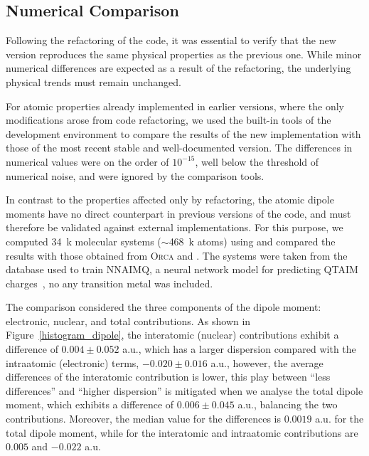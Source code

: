 \subsection{Numerical Comparison}

Following the refactoring of the code, it was essential to verify that the new
version reproduces the same physical properties as the previous one. While
minor numerical differences are expected as a result of the refactoring, the
underlying physical trends must remain unchanged.

For atomic properties already implemented in earlier versions, where the only
modifications arose from code refactoring, we used the built-in tools of the
\ams development environment to compare the results of the new implementation
with those of the most recent stable and well-documented version. The
differences in numerical values were on the order of $10^{-15}$, well below the
threshold of numerical noise, and were ignored by the comparison tools.

\lstset{style=mystyle}

In contrast to the properties affected only by refactoring, the atomic dipole
moments have no direct counterpart in previous versions of the code, and must
therefore be validated against external implementations. For this purpose, we
computed 34~k molecular systems ($\sim$468~k atoms) using \adf and compared the
results with those obtained from \textsc{Orca} and \aimall. The systems were
taken from the database used to train NNAIMQ, a neural network model for
predicting \gls{QTAIM} charges~\cite{Gallegos2022}, no any transition metal was
included.

\newpage
The comparison considered the three components of the dipole moment:
electronic, nuclear, and total contributions.
As shown in Figure~\ref{histogram_dipole}, the interatomic
(nuclear) contributions exhibit a difference of $0.004 $ a.u., which has
a larger dispersion compared with the intraatomic (electronic) terms,
$-0.020 $ a.u., however, the average differences of the interatomic
contribution is lower, this play between ``less differences'' and ``higher
dispersion'' is mitigated when we analyse the total dipole moment, which
exhibits a difference of $0.006 $ a.u., balancing the two contributions.
Moreover, the median value for the differences is $0.0019$ a.u. for the total dipole
moment, while for the interatomic and intraatomic contributions are $0.005$ and
$-0.022$ a.u.

